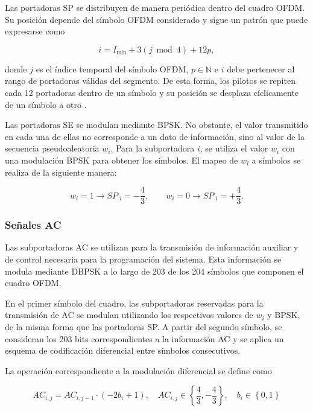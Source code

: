 Las portadoras SP se distribuyen de manera periódica dentro del cuadro OFDM. Su posición depende del símbolo OFDM considerado y sigue un patrón que puede expresarse como

\begin{equation}
i = I_{\min} + 3(j \bmod 4) + 12p,
\end{equation}

donde $j$ es el índice temporal del símbolo OFDM, $p \in \mathbb{N}$ e $i$ debe pertenecer al rango de portadoras válidas del segmento. De esta forma, los pilotos se repiten cada 12 portadoras dentro de un símbolo y su posición se desplaza cíclicamente de un símbolo a otro \cite{portugues}.

Las portadoras SE se modulan mediante BPSK. No obstante, el valor transmitido en cada una de ellas no corresponde a un dato de información, sino al valor de la secuencia pseudoaleatoria $w_i$. Para la subportadora $i$, se utiliza el valor $w_i$ con una modulación BPSK para obtener los símbolos. El mapeo de $w_i$ a símbolos se realiza de la siguiente manera:

\begin{equation}
w_i=1 \rightarrow SP\ _i = -\frac43, \qquad
w_i=0 \rightarrow SP\ _i =+\frac43.
\end{equation}

\subsubsection{Señales AC}
Las subportadoras AC se utilizan para la transmisión de información auxiliar y de control necesaria para la programación del sistema. Esta información se modula mediante DBPSK a lo largo de 203 de los 204 símbolos que componen el cuadro OFDM.

En el primer símbolo del cuadro, las subportadoras reservadas para la transmisión de AC se modulan  utilizando los respectivos valores de $w_i$ y BPSK, de la misma forma que las portadoras SP. A partir del segundo símbolo, se consideran los 203 bits correspondientes a la información AC y se aplica un esquema de codificación diferencial entre símbolos consecutivos.

La operación correspondiente a la modulación diferencial se define como

\begin{equation}
    AC_{i,j} = AC_{i,j-1} \cdot (-2b_i + 1), \quad AC_{i,j} \in \left\lbrace \frac{4}{3}, -\frac{4}{3} \right\rbrace, \quad b_i \in \left\lbrace 0, 1 \right\rbrace
\end{equation}

